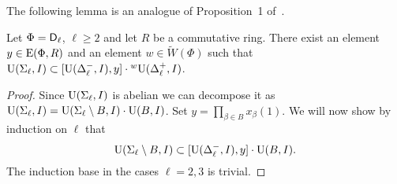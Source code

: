 The following lemma is an analogue of Proposition~1 of~\cite{NikProdDecomp}.
\begin{lemma}\label{lemma:nikolov-type-dl}
Let $\Phi=\mathsf{D}_\ell$, $\ell\geq 2$ and let $R$ be a commutative ring.
There exist an element $y\in\operatorname{E}(\Phi,R)$ and an element $w\in\widetilde{W}(\Phi)$ such that $\operatorname{U}(\Sigma_\ell, I)\subset[\operatorname{U}(\Delta_\ell^-, I),y]\cdot{}^w\!\operatorname{U}(\Delta_\ell^+, I)$.
\end{lemma}
\begin{proof}
Since $\operatorname{U}(\Sigma_\ell, I)$ is abelian we can decompose it as $\operatorname{U}(\Sigma_\ell, I)=\operatorname{U}(\Sigma_\ell\setminus B, I) \cdot \operatorname{U}(B, I)$. 
Set $y=\prod_{\beta\in B}x_\beta(1)$. 
We will now show by induction on $\ell$ that 
\begin{equation}\label{eq:ind-stat} \operatorname{U}(\Sigma_\ell\setminus B, I)\subset[\operatorname{U}(\Delta_\ell^-, I),y]\cdot\operatorname{U}(B, I). \end{equation}
The induction base in the cases $\ell=2, 3$ is trivial.


\end{proof}
